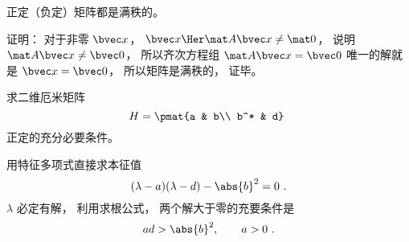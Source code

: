 \begin{theorem}{}
正定（负定）矩阵都是满秩的。
\end{theorem}
证明： 对于非零 $\bvec x$， $\bvec x\Her \mat A \bvec x \ne \mat 0$， 说明 $\mat A\bvec x \ne \bvec 0$， 所以齐次方程组 $\mat A\bvec x = \bvec 0$ 唯一的解就是 $\bvec x = \bvec 0$， 所以矩阵是满秩的， 证毕。

\begin{example}{}
求二维厄米矩阵
\begin{equation}
H = \pmat{a & b\\ b^* & d}~
\end{equation}
正定的充分必要条件。

用特征多项式直接求本征值
\begin{equation}
(\lambda - a)(\lambda - d) - \abs{b}^2 = 0~.
\end{equation}
$\lambda$ 必定有解， 利用求根公式， 两个解大于零的充要条件是
\begin{equation}
ad > \abs{b}^2, \qquad
a > 0~.
\end{equation}
\end{example}
